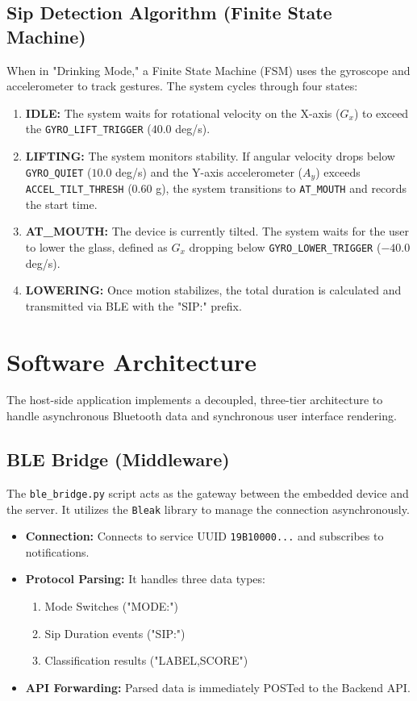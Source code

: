 \documentclass[12pt]{article}
\begin{document}
\subsection{Sip Detection Algorithm (Finite State Machine)}
When in "Drinking Mode," a Finite State Machine (FSM) uses the gyroscope and accelerometer to track gestures. The system cycles through four states:

\begin{enumerate}
    \item \textbf{IDLE:} The system waits for rotational velocity on the X-axis ($G_x$) to exceed the \texttt{GYRO\_LIFT\_TRIGGER} ($40.0$ deg/s).
    \item \textbf{LIFTING:} The system monitors stability. If angular velocity drops below \texttt{GYRO\_QUIET} ($10.0$ deg/s) and the Y-axis accelerometer ($A_y$) exceeds \texttt{ACCEL\_TILT\_THRESH} ($0.60$ g), the system transitions to \texttt{AT\_MOUTH} and records the start time.
    \item \textbf{AT\_MOUTH:} The device is currently tilted. The system waits for the user to lower the glass, defined as $G_x$ dropping below \texttt{GYRO\_LOWER\_TRIGGER} ($-40.0$ deg/s).
    \item \textbf{LOWERING:} Once motion stabilizes, the total duration is calculated and transmitted via BLE with the "SIP:" prefix.
\end{enumerate}


\section{Software Architecture}
The host-side application implements a decoupled, three-tier architecture to handle asynchronous Bluetooth data and synchronous user interface rendering.

\subsection{BLE Bridge (Middleware)}
The \texttt{ble\_bridge.py} script acts as the gateway between the embedded device and the server. It utilizes the \texttt{Bleak} library to manage the connection asynchronously.
\begin{itemize}
    \item \textbf{Connection:} Connects to service UUID \texttt{19B10000...} and subscribes to notifications.
    \item \textbf{Protocol Parsing:} It handles three data types:
    \begin{enumerate}
        \item Mode Switches ("MODE:")
        \item Sip Duration events ("SIP:")
        \item Classification results ("LABEL,SCORE")
    \end{enumerate}
    \item \textbf{API Forwarding:} Parsed data is immediately POSTed to the Backend API.
\end{itemize}
\end{document}
